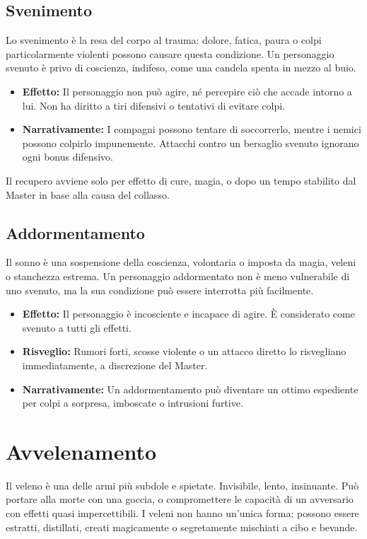 \documentclass[../manuale_main.tex]{subfiles}
\begin{document}
\subsection*{Svenimento}
Lo svenimento è la resa del corpo al trauma: dolore, fatica, paura o colpi particolarmente violenti possono causare questa condizione. Un personaggio svenuto è privo di coscienza, indifeso, come una candela spenta in mezzo al buio.

\begin{itemize}
\item \textbf{Effetto:} Il personaggio non può agire, né percepire ciò che accade intorno a lui. Non ha diritto a tiri difensivi o tentativi di evitare colpi.
\item \textbf{Narrativamente:} I compagni possono tentare di soccorrerlo, mentre i nemici possono colpirlo impunemente. Attacchi contro un bersaglio svenuto ignorano ogni bonus difensivo.
\end{itemize}

Il recupero avviene solo per effetto di cure, magia, o dopo un tempo stabilito dal Master in base alla causa del collasso.

\subsection*{Addormentamento}
Il sonno è una sospensione della coscienza, volontaria o imposta da magia, veleni o stanchezza estrema. Un personaggio addormentato non è meno vulnerabile di uno svenuto, ma la sua condizione può essere interrotta più facilmente.

\begin{itemize}
\item \textbf{Effetto:} Il personaggio è incosciente e incapace di agire. È considerato come svenuto a tutti gli effetti.
\item \textbf{Risveglio:} Rumori forti, scosse violente o un attacco diretto lo risvegliano immediatamente, a discrezione del Master.
\item \textbf{Narrativamente:} Un addormentamento può diventare un ottimo espediente per colpi a sorpresa, imboscate o intrusioni furtive.
\end{itemize}
\clearpage
\section{Avvelenamento}

Il veleno è una delle armi più subdole e spietate. Invisibile, lento, insinuante. Può portare alla morte con una goccia, o compromettere le capacità di un avversario con effetti quasi impercettibili. I veleni non hanno un’unica forma: possono essere estratti, distillati, creati magicamente o segretamente mischiati a cibo e bevande.
\end{document}
